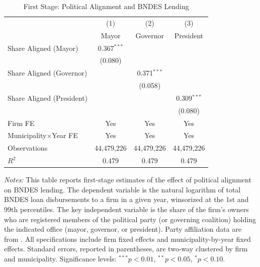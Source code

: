 \documentclass{article}
\begin{document}
\begin{table}[H]
    \centering
    \caption{First Stage: Political Alignment and BNDES Lending}
    \label{tab:first_stage}
    \begin{threeparttable}
        \begin{tabular}{lccc}
            \toprule
                                        & (1)           & (2)           & (3)           \\
                                        & Mayor         & Governor      & President     \\
            \midrule
            Share Aligned (Mayor)       & 0.367$^{***}$ &               &               \\
                                        & (0.080)       &               &               \\
            Share Aligned (Governor)    &               & 0.371$^{***}$ &               \\
                                        &               & (0.058)       &               \\
            Share Aligned (President)   &               &               & 0.309$^{***}$ \\
                                        &               &               & (0.080)       \\
            \midrule
            Firm FE                     & Yes           & Yes           & Yes           \\
            Municipality$\times$Year FE & Yes           & Yes           & Yes           \\
            \midrule
            Observations                & 44,479,226    & 44,479,226    & 44,479,226    \\
            $R^2$                       & 0.479         & 0.479         & 0.479         \\
            \bottomrule
        \end{tabular}
        \begin{tablenotes}
            \small
            \item \textit{Notes:} This table reports first-stage estimates of the effect of political alignment on BNDES lending. The dependent variable is the natural logarithm of total BNDES loan disbursements to a firm in a given year, winsorized at the 1st and 99th percentiles. The key independent variable is the share of the firm's owners who are registered members of the political party (or governing coalition) holding the indicated office (mayor, governor, or president). Party affiliation data are from \citet{colonnelli2025politics}. All specifications include firm fixed effects and municipality-by-year fixed effects. Standard errors, reported in parentheses, are two-way clustered by firm and municipality. Significance levels: $^{***}p<0.01$, $^{**}p<0.05$, $^{*}p<0.10$.
        \end{tablenotes}
    \end{threeparttable}
\end{table}
\end{document}
